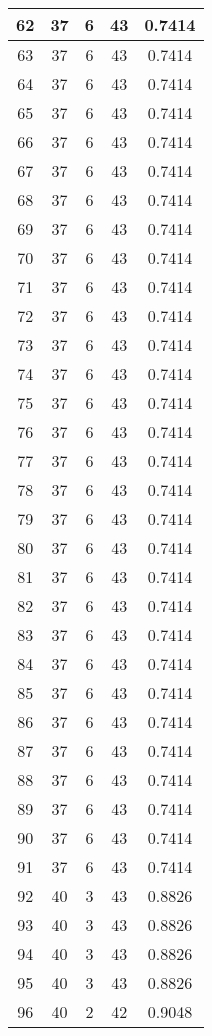 \documentclass[letterpaper, 12pt]{article}
\begin{document}
\begin{longtable}{|c|c|c|c|c|}
\hline
62 & 37 & 6 & 43 & 0.7414 \\
\hline
63 & 37 & 6 & 43 & 0.7414 \\
\hline
64 & 37 & 6 & 43 & 0.7414 \\
\hline
65 & 37 & 6 & 43 & 0.7414 \\
\hline
66 & 37 & 6 & 43 & 0.7414 \\
\hline
67 & 37 & 6 & 43 & 0.7414 \\
\hline
68 & 37 & 6 & 43 & 0.7414 \\
\hline
69 & 37 & 6 & 43 & 0.7414 \\
\hline
70 & 37 & 6 & 43 & 0.7414 \\
\hline
71 & 37 & 6 & 43 & 0.7414 \\
\hline
72 & 37 & 6 & 43 & 0.7414 \\
\hline
73 & 37 & 6 & 43 & 0.7414 \\
\hline
74 & 37 & 6 & 43 & 0.7414 \\
\hline
75 & 37 & 6 & 43 & 0.7414 \\
\hline
76 & 37 & 6 & 43 & 0.7414 \\
\hline
77 & 37 & 6 & 43 & 0.7414 \\
\hline
78 & 37 & 6 & 43 & 0.7414 \\
\hline
79 & 37 & 6 & 43 & 0.7414 \\
\hline
80 & 37 & 6 & 43 & 0.7414 \\
\hline
81 & 37 & 6 & 43 & 0.7414 \\
\hline
82 & 37 & 6 & 43 & 0.7414 \\
\hline
83 & 37 & 6 & 43 & 0.7414 \\
\hline
84 & 37 & 6 & 43 & 0.7414 \\
\hline
85 & 37 & 6 & 43 & 0.7414 \\
\hline
86 & 37 & 6 & 43 & 0.7414 \\
\hline
87 & 37 & 6 & 43 & 0.7414 \\
\hline
88 & 37 & 6 & 43 & 0.7414 \\
\hline
89 & 37 & 6 & 43 & 0.7414 \\
\hline
90 & 37 & 6 & 43 & 0.7414 \\
\hline
91 & 37 & 6 & 43 & 0.7414 \\
\hline
92 & 40 & 3 & 43 & 0.8826 \\
\hline
93 & 40 & 3 & 43 & 0.8826 \\
\hline
94 & 40 & 3 & 43 & 0.8826 \\
\hline
95 & 40 & 3 & 43 & 0.8826 \\
\hline
96 & 40 & 2 & 42 & 0.9048 \\

\end{longtable}
\end{document}
